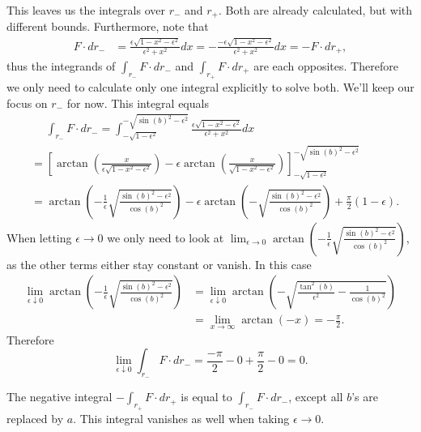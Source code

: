 \documentclass[twoside,a4paper]{article}
\theoremstyle{plain}
\theoremstyle{definition}
\theoremstyle{remark}
\numberwithin{equation}{section}
\DeclareMathOperator{\1}{\mathbbm{1}}
\begin{document}
This leaves us the integrals over $r_-$ and $r_+$. Both are already calculated, but with different bounds. Furthermore, note that
\begin{align*}
F\cdot dr_-&=\frac{\epsilon\sqrt{1-x^2-\epsilon^2}}{\epsilon^2+x^2}dx=-\frac{-\epsilon\sqrt{1-x^2-\epsilon^2}}{\epsilon^2+x^2}dx=-F\cdot dr_+,
\end{align*}
thus the integrands of $\int_{r_-}F\cdot dr_-$ and $\int_{r_+}F\cdot dr_+$ are each opposites. Therefore we only need to calculate only one integral explicitly to solve both. We'll keep our focus on $r_-$ for now. This integral equals
\begin{align*}
&\phantom{=}\int_{r_-}F\cdot dr_-=\int_{-\sqrt{1-\epsilon^2}}^{-\sqrt{\sin(b)^2-\epsilon^2}}\frac{\epsilon\sqrt{1-x^2-\epsilon^2}}{\epsilon^2+x^2}dx\\
&=\left[\arctan\left(\frac{x}{\epsilon\sqrt{1-x^2-\epsilon^2}}\right)-\epsilon\arctan\left(\frac{x}{\sqrt{1-x^2-\epsilon^2}}\right)\right]_{-\sqrt{1-\epsilon^2}}^{-\sqrt{\sin(b)^2-\epsilon^2}}\\
&=\arctan\left(-\frac{1}{\epsilon}\sqrt{\frac{\sin(b)^2-\epsilon^2}{\cos(b)^2}}\right)-\epsilon\arctan\left(-\sqrt{\frac{\sin(b)^2-\epsilon^2}{\cos(b)^2}}\right)+\frac{\pi}{2}\left(1-\epsilon\right).
\end{align*}
When letting $\epsilon\to0$ we only need to look at $\lim_{\epsilon\to0}\arctan\left(-\frac{1}{\epsilon}\sqrt{\frac{\sin(b)^2-\epsilon^2}{\cos(b)^2}}\right)$, as the other terms either stay constant or vanish. In this case
\begin{align*}\lim_{\epsilon\downarrow0}\arctan\left(-\frac{1}{\epsilon}\sqrt{\frac{\sin(b)^2-\epsilon^2}{\cos(b)^2}}\right)&=\lim_{\epsilon\downarrow0}\arctan\left(-\sqrt{\frac{\tan^2(b)}{\epsilon^2}-\frac{1}{\cos(b)^2}}\right)\\
&=\lim_{x\to\infty}\arctan(-x)=-\frac{\pi}{2}.
\end{align*}
Therefore
\[\lim_{\epsilon\downarrow0}\int_{r_-}F\cdot dr_-=\frac{-\pi}{2}-0+\frac{\pi}{2}-0=0.\]

The negative integral $-\int_{r_+}F\cdot dr_+$ is equal to $\int_{r_-}F\cdot dr_-$, except all $b$'s are replaced by $a$. This integral vanishes as well when taking $\epsilon\to0$.
\end{document}
